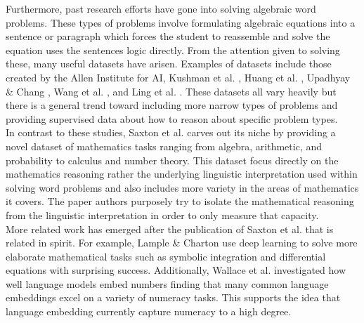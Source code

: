 Furthermore, past research efforts have gone into solving algebraic word problems. These types of problems involve formulating algebraic equations into a sentence or paragraph which forces the student to reassemble and solve the equation uses the sentences logic directly. From the attention given to solving these, many useful datasets have arisen. Examples of datasets include those created by the Allen Institute for AI, Kushman et al. \supercite{kushman2014learning}, Huang et al. \supercite{huang2016well},  Upadhyay \& Chang \supercite{upadhyay2016annotating}, Wang et al. \supercite{wang2017deep}, and Ling et al. \supercite{ling2017program}. These datasets all vary heavily but there is a general trend toward including more narrow types of problems and providing supervised data about how to reason about specific problem types.  \\


In contrast to these studies, Saxton et al. \supercite{DBLP:journals/corr/abs-1904-01557} carves out its niche by providing a novel dataset of mathematics tasks ranging from algebra, arithmetic, and probability to calculus and number theory. This dataset focus directly on the mathematics reasoning rather the underlying linguistic interpretation used within solving word problems and also includes more variety in the areas of mathematics it covers. The paper authors purposely try to isolate the mathematical reasoning from the linguistic interpretation in order to only measure that capacity. \\

More related work has emerged after the publication of Saxton et al.\supercite{DBLP:journals/corr/abs-1904-01557} that is related in spirit. For example, Lample \& Charton \supercite{lample2019deep} use deep learning to solve more elaborate mathematical tasks such as symbolic integration and differential equations with surprising success.  Additionally, Wallace et al. \supercite{wallace2019nlp} investigated how well language models embed numbers finding that many common language embeddings excel on a variety of numeracy tasks. This supports the idea that language embedding currently capture numeracy to a high degree. \\



